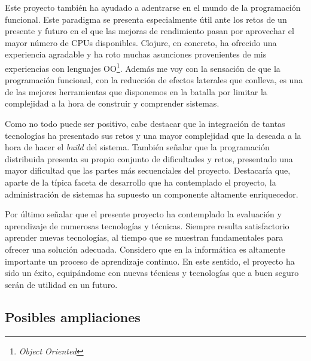 Este proyecto también ha ayudado a adentrarse en el mundo de la
programación funcional\cite{FUNCTIONAL}. Este paradigma se presenta
especialmente útil ante los retos de un presente y futuro en el que
las mejoras de rendimiento pasan por aprovechar el mayor número de
CPUs disponibles. Clojure, en concreto, ha ofrecido una experiencia
agradable y ha roto muchas asunciones provenientes de mis experiencias
con lenguajes OO\footnote{\emph{Object Oriented}}. Además me voy con
la sensación de que la programación funcional, con la reducción de
efectos laterales que conlleva, es una de las mejores herramientas que
disponemos en la batalla por limitar la complejidad a la hora de
construir y comprender sistemas.
%

Como no todo puede ser positivo, cabe destacar que la integración de
tantas tecnologías ha presentado sus retos y una mayor complejidad que
la deseada a la hora de hacer el \emph{build} del sistema. También
señalar que la programación distribuida presenta su propio conjunto de
dificultades y retos, presentado una mayor dificultad que las partes
más secuenciales del proyecto. Destacaría que, aparte de la típica
faceta de desarrollo que ha contemplado el proyecto, la administración
de sistemas ha supuesto un componente altamente enriquecedor.

Por último señalar que el presente proyecto ha contemplado la
evaluación y aprendizaje de numerosas tecnologías y técnicas. Siempre
resulta satisfactorio aprender nuevas tecnologías, al tiempo que se
muestran fundamentales para ofrecer una solución adecuada. Considero
que en la informática es altamente importante un proceso de
aprendizaje continuo. En este sentido, el proyecto ha sido un éxito,
equipándome con nuevas técnicas y tecnologías que a buen seguro serán
de utilidad en un futuro.

\subsection{Posibles ampliaciones}

